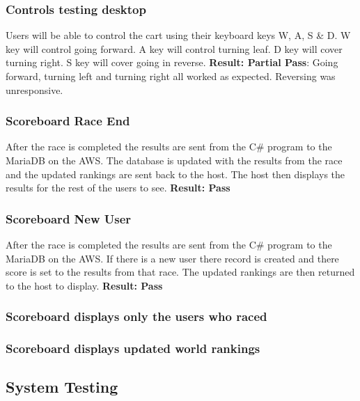 \subsubsection{Controls testing desktop}\newline
Users will be able to control the cart using their keyboard keys W, A, S & D. W key will control going forward. A key will control turning leaf. D key will cover turning right. S key will cover going in reverse. \newline
\textbf{Result: Partial Pass}: Going forward, turning left and turning right all worked as expected. Reversing was unresponsive. 

\subsubsection{Scoreboard Race End}\newline
After the race is completed the results are sent from the C\# program to the MariaDB on the AWS. The database is updated with the results from the race and the updated rankings are sent back to the host. The host then displays the results for the rest of the users to see.\newline 
\textbf{Result: Pass}

\subsubsection{Scoreboard New User}\newline
After the race is completed the results are sent from the C# program to the MariaDB on the AWS. If there is a new user there record is created and there score is set to the results from that race. The updated rankings are then returned to the host to display.\newline
\textbf{Result: Pass}

\subsubsection{Scoreboard displays only the users who raced}\newline

\subsubsection{Scoreboard displays updated world rankings}\newline


\subsection{System Testing } \newline

